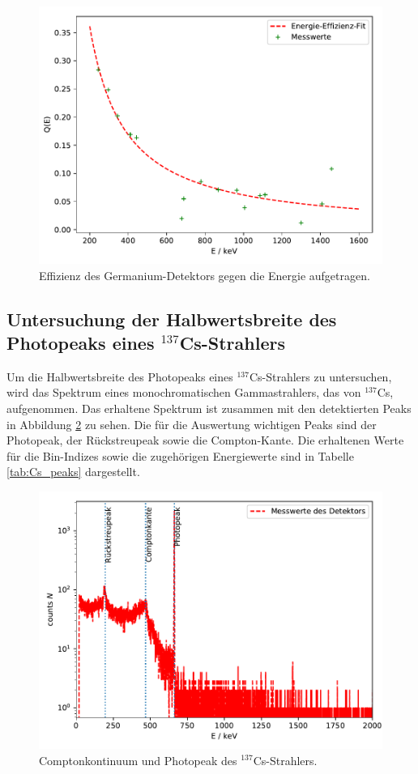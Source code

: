 \FloatBarrier
\begin{figure}
    \centering
    \includegraphics[scale=0.7]{effizienz.pdf}
    \caption{Effizienz des Germanium-Detektors gegen die Energie aufgetragen.}
    \label{abb:effizienz}
\end{figure}
\FloatBarrier

\subsection{Untersuchung der Halbwertsbreite des Photopeaks eines $^{137}$Cs-Strahlers}

Um die Halbwertsbreite des Photopeaks eines $^{137}$Cs-Strahlers zu untersuchen,
wird das Spektrum eines monochromatischen Gammastrahlers, das von $^{137}$Cs,
aufgenommen. Das erhaltene Spektrum ist zusammen mit den detektierten Peaks in
Abbildung \ref{abb:Cs_peaks} zu sehen. Die für die Auswertung wichtigen Peaks sind der
Photopeak, der Rückstreupeak sowie die Compton-Kante. Die erhaltenen Werte für die
Bin-Indizes sowie die zugehörigen Energiewerte sind in Tabelle \ref{tab:Cs_peaks}
dargestellt.

\FloatBarrier
\begin{figure}
    \centering
    \includegraphics[scale=0.7]{Cs_fit.pdf}
    \caption{Comptonkontinuum und Photopeak des $^{137}$Cs-Strahlers.}
    \label{abb:Cs_peaks}
\end{figure}
\FloatBarrier

